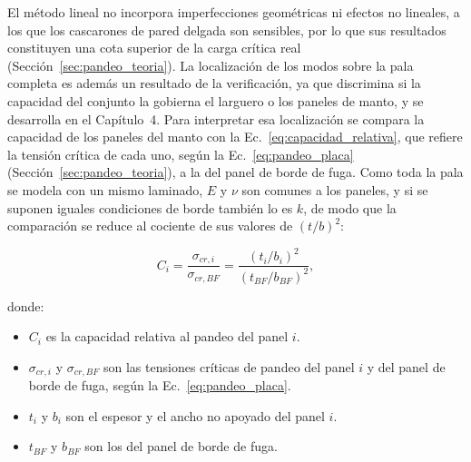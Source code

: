 El método lineal no incorpora imperfecciones geométricas ni efectos no lineales, a los que los cascarones de pared delgada son sensibles, por lo que sus resultados constituyen una cota superior de la carga crítica real (Sección~\ref{sec:pandeo_teoria}). La localización de los modos sobre la pala completa es además un resultado de la verificación, ya que discrimina si la capacidad del conjunto la gobierna el larguero o los paneles de manto, y se desarrolla en el Capítulo~4. Para interpretar esa localización se compara la capacidad de los paneles del manto con la Ec.~\ref{eq:capacidad_relativa}, que refiere la tensión crítica de cada uno, según la Ec.~\ref{eq:pandeo_placa} (Sección~\ref{sec:pandeo_teoria}), a la del panel de borde de fuga. Como toda la pala se modela con un mismo laminado, $E$ y $\nu$ son comunes a los paneles, y si se suponen iguales condiciones de borde también lo es $k$, de modo que la comparación se reduce al cociente de sus valores de $(t/b)^2$:

\begin{equation}
    C_i = \frac{\sigma_{cr,i}}{\sigma_{cr,BF}} = \frac{(t_i/b_i)^2}{(t_{BF}/b_{BF})^2},
    \label{eq:capacidad_relativa}
\end{equation}

donde:
\begin{itemize}
    \item $C_i$ es la capacidad relativa al pandeo del panel $i$.
    \item $\sigma_{cr,i}$ y $\sigma_{cr,BF}$ son las tensiones críticas de pandeo del panel $i$ y del panel de borde de fuga, según la Ec.~\ref{eq:pandeo_placa}.
    \item $t_i$ y $b_i$ son el espesor y el ancho no apoyado del panel $i$.
    \item $t_{BF}$ y $b_{BF}$ son los del panel de borde de fuga.
\end{itemize}

